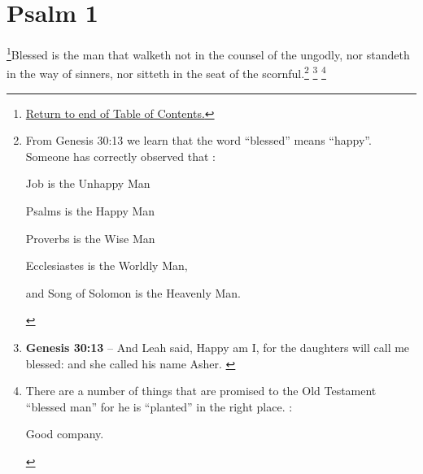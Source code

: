\chapter{Psalm 1}

\footnote{\textcolor[rgb]{0.00,0.25,0.00}{\hyperlink{TOC}{Return to end of Table of Contents.}}}\textcolor[rgb]{0.00,0.00,1.00}{Blessed is the man that walketh not in the counsel of the ungodly, nor standeth in the way of sinners, nor sitteth in the seat of the scornful.}\footnote{From Genesis 30:13 we learn that the word ``blessed'' means ``happy''. Someone has correctly observed that \cite{Ruckman1992Psalms}:\begin{compactitem}
\item Job is the Unhappy Man
\item Psalms is the Happy Man
\item Proverbs is the Wise Man
\item Ecclesiastes is the Worldly Man, 
\item and Song of Solomon is the Heavenly Man.
\end{compactitem}} \footnote{\textbf{Genesis 30:13} -- And Leah said, Happy am I, for the daughters will call me blessed: and she called his name Asher. \cite{Ruckman1992Psalms}} \footnote{There are a number of things that are promised to the Old Testament ``blessed man'' for he is ``planted'' in the right place. \cite{Ruckman1992Psalms}:\begin{compactenum}
\item Good company.

\end{compactenum}}
